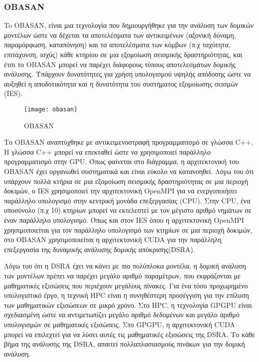 \subsubsection{OBASAN}
To OBASAN, είναι μια τεχνολογία που δημιουργήθηκε για την ανάλυση των δομικών μοντέλων ώστε να δέχεται τα αποτελέσματα των αντικειμένων (αξονική δύναμη, παραμόρφωση, καταπόνηση) και τα αποτελέσματα των κόμβων (π.χ ταχύτητα, επιτάχυνση, ισχύς) κάθε κτηρίου σε μια εξομοίωση σεισμικής δραστηριότητας, και έτσι το OBASAN μπορεί να παρέχει διάφορους τύπους αποτελεσμάτων δομικής ανάλυσης. Υπάρχουν δυνατότητες για χρήση υπολογισμού υψηλής απόδοσης ώστε να αυξηθεί η αποδοτικότητα και η δυνατότητα του συστήματος εξομοίωσης σεισμών (IES). 

\begin{figure}[h]
\centering
\hspace*{-1.0in}
\texttt{[image: obasan]}
\caption{OBASAN\cite{figure-20}}
\end{figure}

Το OBASAN αναπτύχθηκε με αντικειμενοστραφή προγραμματισμό σε γλώσσα C++. Η γλώσσα C++ μπορεί να επεκταθεί ώστε να χρησιμοποιεί παράλληλο προγραμματισμό στην GPU. Όπως φαίνεται στο διάγραμμα, η αρχιτεκτονική του OBASAN έχει οργανωθεί συστηματικά και είναι εύκολο να κατανοηθεί. Λόγω του ότι υπάρχουν πολλά κτήρια σε μια εξομοίωση σεισμικής δραστηριότητας σε μια περιοχή δοκιμών, ο IES χρησιμοποιεί την αρχιτεκτονική OpenMPI για να ενεργοποιήσει παράλληλο υπολογισμό στην κεντρική μονάδα επεξεργασίας (CPU). Στην CPU, ένα υποσύνολο (π.χ 10) κτηρίων μπορεί να εκτελεστεί με τον μέγιστο αριθμό νημάτων σε έναν παράλληλο υπολογισμό. Όπως και στον IES όπου η αρχιτεκτονική OpenMPI χρησιμοποιείται για τον παράλληλο υπολογισμό των κτηρίων σε μια περιοχή δοκιμών, στο OBASAN χρησιμοποιείται η αρχιτεκτονική CUDA για την παράλληλη επεξεργασία της δυναμικής ανάλυσης δομικής απόκρισης(DSRA).

Λόγω του ότι η DSRA έχει να κάνει με πιο πολύπλοκα μοντέλα, η δομική ανάλυση των μοντέλων πρέπει να παρέχει μεγάλο αριθμό παραμέτρων, που εκφράζονται με μαθηματικές εξισώσεις που περιέχουν μεγάλους πίνακες. Για ένα τόσο προχωρημένο υπολογιστικό έργο, η τεχνική HPC είναι η συνηθέστερη προσέγγιση για την επίλυση των μαθηματικών εξισώσεων σε μικρό χρόνο. Στο HPC, η τεχνολογία GPGPU είναι σχεδιασμένη ώστε να αντιμετωπίζει μεγάλο αριθμό δεδομένων και μεγάλο αριθμό υπολογισμών σε μαθηματικές εξισώσεις. Στο GPGPU, η αρχιτεκτονική CUDA μπορεί να επιλεχτεί για να λύσει αυτές τις μαθηματικές εξισώσεις της DSRA. Το κάθε βήμα της ανάλυσης της DSRA, απαιτεί πολλαπλασιασμούς πινάκων για την δομική ανάλυση.

